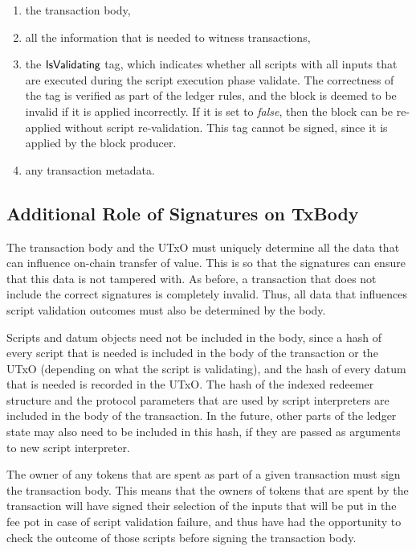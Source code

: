 \begin{enumerate}
  \item the transaction body,
  \item all the information that is needed to witness transactions,
  \item the $\mathsf{IsValidating}$ tag, which indicates whether all scripts with all inputs
  that are executed during the script execution phase validate.
  The correctness of the tag is verified as part of the ledger rules, and the block is
  deemed to be invalid if it is applied incorrectly.
  If it is set to \emph{false}, then the block can be re-applied without script re-validation.
  This tag cannot be signed, since it is applied by the block producer.
  \item any transaction metadata.
\end{enumerate}

\subsection{Additional Role of Signatures on TxBody}

The transaction body and the UTxO must uniquely determine all the data
that can influence on-chain transfer of value.
This is so that the signatures can ensure that this data is not tampered with.
As before, a transaction that does not include the correct signatures is completely invalid.
Thus, all data that influences script validation outcomes must also be determined by the body.

Scripts and datum objects need not be included in the body,
since a hash of every script that is needed
is included in the body of the transaction or the UTxO (depending on what the script is validating),
and the hash of every datum that is needed is recorded in the UTxO.
%
The hash of the indexed redeemer structure and the protocol parameters that are used by
script interpreters are included in the body of the transaction. In the future, other parts of the ledger
state may also need to be included in this hash, if they are passed as
arguments to new script interpreter.

The owner of any tokens that are spent as part of a given transaction
must sign the transaction body. This means that
the owners of tokens that are spent by the transaction will have
signed their selection of the inputs that will be put in the fee pot in case of script validation failure, and
thus have had the opportunity to check the outcome of those scripts before signing the transaction body.

